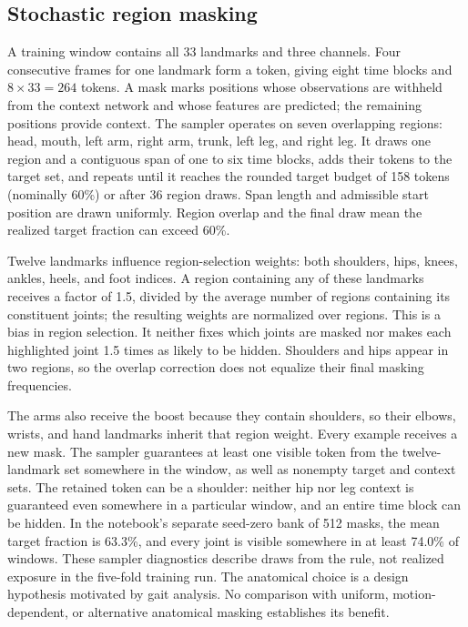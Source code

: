 \documentclass[10pt,twocolumn,letterpaper]{article}
\begin{document}
\subsection{Stochastic region masking}
A training window contains all 33 landmarks and three channels. Four consecutive frames for one landmark form a token, giving eight time blocks and $8\times33=264$ tokens. A mask marks positions whose observations are withheld from the context network and whose features are predicted; the remaining positions provide context. The sampler operates on seven overlapping regions: head, mouth, left arm, right arm, trunk, left leg, and right leg. It draws one region and a contiguous span of one to six time blocks, adds their tokens to the target set, and repeats until it reaches the rounded target budget of 158 tokens (nominally 60\%) or after 36 region draws. Span length and admissible start position are drawn uniformly. Region overlap and the final draw mean the realized target fraction can exceed 60\%.

Twelve landmarks influence region-selection weights: both shoulders, hips, knees, ankles, heels, and foot indices. A region containing any of these landmarks receives a factor of 1.5, divided by the average number of regions containing its constituent joints; the resulting weights are normalized over regions. This is a bias in region selection. It neither fixes which joints are masked nor makes each highlighted joint 1.5 times as likely to be hidden. Shoulders and hips appear in two regions, so the overlap correction does not equalize their final masking frequencies.

The arms also receive the boost because they contain shoulders, so their elbows, wrists, and hand landmarks inherit that region weight. Every example receives a new mask. The sampler guarantees at least one visible token from the twelve-landmark set somewhere in the window, as well as nonempty target and context sets. The retained token can be a shoulder: neither hip nor leg context is guaranteed even somewhere in a particular window, and an entire time block can be hidden. In the notebook's separate seed-zero bank of 512 masks, the mean target fraction is 63.3\%, and every joint is visible somewhere in at least 74.0\% of windows. These sampler diagnostics describe draws from the rule, not realized exposure in the five-fold training run. The anatomical choice is a design hypothesis motivated by gait analysis. No comparison with uniform, motion-dependent, or alternative anatomical masking establishes its benefit.
\end{document}
